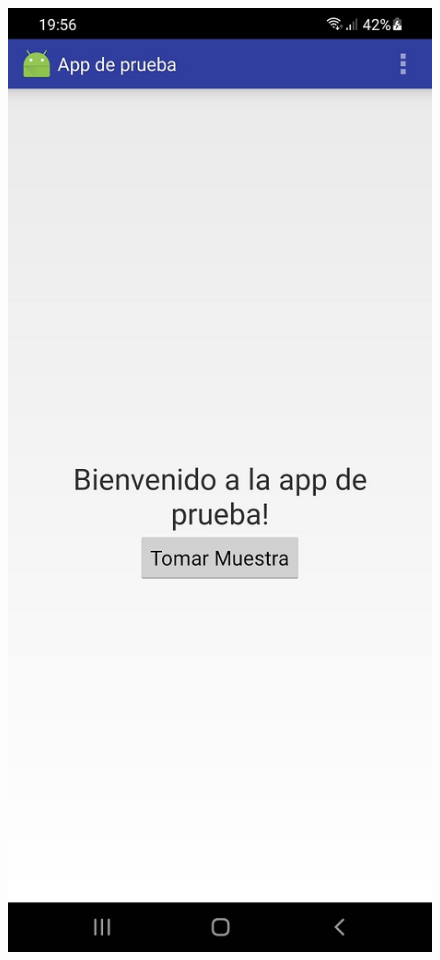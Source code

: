 \begin{figure}[H]
	\begin{center}
   \includegraphics[scale=0.3]{05-implementacion/app_generada_ejemplo1.jpg} 

\end{center}
\end{figure}
